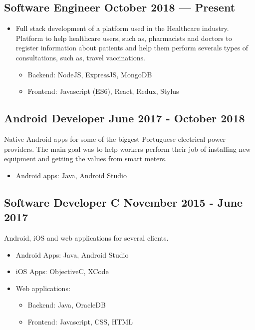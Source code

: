 \subsection{{Software Engineer \hfill October 2018 --- Present}}

\begin{itemize}
    \item Full stack development of a platform used in the Healthcare industry.
	Platform to help healthcare users, such as, pharmacists 
	and doctors to register information about patients and 
	help them perform severals types of consultations, 
	such as, travel vaccinations.
    \begin{itemize}
        \item Backend: NodeJS, ExpressJS, MongoDB
        \item Frontend: Javascript (ES6), React, Redux, Stylus
    \end{itemize}
\end{itemize}

\subsection{{Android Developer \hfill June 2017 - October 2018}}
\begin{zitemize}
\item Native Android apps for some of the biggest Portuguese 
electrical power providers. 
The main goal was to help workers perform their job of 
installing new equipment and getting the values 
from smart meters.
\begin{itemize}
    \item Android apps: Java, Android Studio
\end{itemize}
\end{zitemize}

\subsection{{Software Developer C \hfill November 2015 - June 2017}}
\begin{zitemize}
\item Android, iOS and web applications for several clients.
\begin{itemize}
    \item Android Apps: Java, Android Studio
    \item iOS Apps: ObjectiveC, XCode
    \item Web applications:
    \begin{itemize}
        \item Backend: Java, OracleDB
	    \item Frontend: Javascript, CSS, HTML
    \end{itemize}
\end{itemize}
\end{zitemize}

